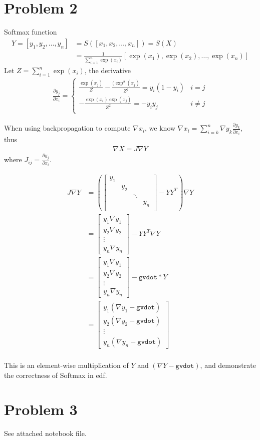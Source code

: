 \documentclass{article}
\begin{document}
\section*{Problem 2}
Softmax function
\begin{align*}
Y = [y_1,y_2,\ldots,y_n] &= S([x_1,x_2,\ldots,x_n]) = S(X)\\
&= \frac{1}{\sum_{i=1}^n
\exp(x_i)}[\exp(x_1),\exp(x_2),\ldots,\exp(x_n)]
\end{align*}
Let $Z = \sum_{i=1}^n\exp(x_i)$, the derivative
\begin{align*}
\frac{\partial y_j}{\partial x_i} =
\left\{
\begin{array}{cc}
\frac{\exp(x_j)}{Z}-\frac{(\exp^2(x_j)}{Z^2} = y_i(1-y_i) & i = j \\
-\frac{\exp(x_i)\exp(x_j)}{Z^2} = -y_iy_j & i \neq j \\
\end{array}
\right.
\end{align*}

When using backpropagation to compute $\nabla x_i$, we know $\nabla x_i =
\sum_{i=k}^n \nabla y_k \frac{\partial y_k}{\partial x_i}$, thus
\begin{align*}
\nabla X = J\nabla Y
\end{align*}
where $J_{ij} = \frac{\partial y_j}{\partial x_i}$.

\begin{align*}
J\nabla Y &= \left(\left[ 
\begin{array}{cccc}
y_1 & & & \\
 &y_2 & &\\
& & \ddots & \\
& & & y_n\\
\end{array}
\right] - YY^T\right)\nabla Y \\
&= \left[\begin{array}{c}y_1\nabla y_1\\y_2\nabla
y_2\\\vdots\\y_n\nabla y_n\end{array}\right] - YY^T\nabla Y\\
&= \left[\begin{array}{c}y_1\nabla y_1\\y_2\nabla
y_2\\\vdots\\y_n\nabla y_n\end{array}\right] - \texttt{gvdot}*Y\\
&=\left[\begin{array}{c}y_1(\nabla y_1 - \texttt{gvdot})\\y_2(\nabla
y_2-\texttt{gvdot})\\\vdots\\y_n(\nabla
y_n-\texttt{gvdot})\end{array}\right]\\
\end{align*}

This is an element-wise multiplication of $Y$ and $(\nabla Y - \texttt{gvdot})$,
and demonstrate the correctness of Softmax in edf.

\section*{Problem 3}
See attached notebook file.
\end{document}
